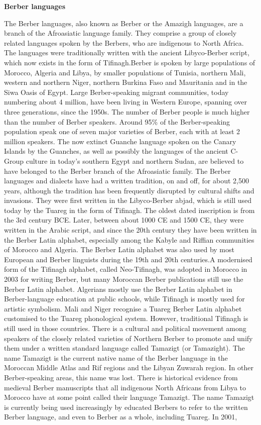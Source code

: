 \documentclass[11pt]{scrartcl} %
\begin{document}
\noindent \textbf{Berber languages}\par

The Berber languages, also known as Berber or the Amazigh languages, are a branch of the Afroasiatic language family. They comprise a group of closely related languages spoken by the Berbers, who are indigenous to North Africa. The languages were traditionally written with the ancient Libyco-Berber script, which now exists in the form of Tifinagh.Berber is spoken by large populations of Morocco, Algeria and Libya, by smaller populations of Tunisia, northern Mali, western and northern Niger, northern Burkina Faso and Mauritania and in the Siwa Oasis of Egypt. Large Berber-speaking migrant communities, today numbering about 4 million, have been living in Western Europe, spanning over three generations, since the 1950s. The number of Berber people is much higher than the number of Berber speakers. Around 95\% of the Berber-speaking population speak one of seven major varieties of Berber, each with at least 2 million speakers. The now extinct Guanche language spoken on the Canary Islands by the Guanches, as well as possibly the languages of the ancient C-Group culture in today's southern Egypt and northern Sudan, are believed to have belonged to the Berber branch of the Afroasiatic family. The Berber languages and dialects have had a written tradition, on and off, for about 2,500 years, although the tradition has been frequently disrupted by cultural shifts and invasions. They were first written in the Libyco-Berber abjad, which is still used today by the Tuareg in the form of Tifinagh. The oldest dated inscription is from the 3rd century BCE. Later, between about 1000 CE and 1500 CE, they were written in the Arabic script, and since the 20th century they have been written in the Berber Latin alphabet, especially among the Kabyle and Riffian communities of Morocco and Algeria. The Berber Latin alphabet was also used by most European and Berber linguists during the 19th and 20th centuries.A modernised form of the Tifinagh alphabet, called Neo-Tifinagh, was adopted in Morocco in 2003 for writing Berber, but many Moroccan Berber publications still use the Berber Latin alphabet. Algerians mostly use the Berber Latin alphabet in Berber-language education at public schools, while Tifinagh is mostly used for artistic symbolism. Mali and Niger recognise a Tuareg Berber Latin alphabet customised to the Tuareg phonological system. However, traditional Tifinagh is still used in those countries. There is a cultural and political movement among speakers of the closely related varieties of Northern Berber to promote and unify them under a written standard language called Tamazigt (or Tamazight). The name Tamazigt is the current native name of the Berber language in the Moroccan Middle Atlas and Rif regions and the Libyan Zuwarah region. In other Berber-speaking areas, this name was lost. There is historical evidence from medieval Berber manuscripts that all indigenous North Africans from Libya to Morocco have at some point called their language Tamazigt. The name Tamazigt is currently being used increasingly by educated Berbers to refer to the written Berber language, and even to Berber as a whole, including Tuareg. In 2001, 
\end{document}

